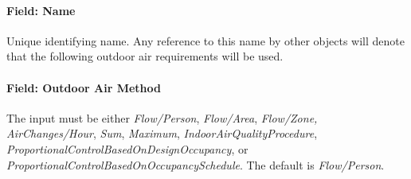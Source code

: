 \paragraph{Field: Name}\label{field-name-011}

Unique identifying name. Any reference to this name by other objects will denote that the following outdoor air requirements will be used.

\paragraph{Field: Outdoor Air Method}\label{field-outdoor-air-method}

The input must be either \emph{Flow/Person}, \emph{Flow/Area}, \emph{Flow/Zone, AirChanges/Hour}, \emph{Sum}, \emph{Maximum}, \emph{IndoorAirQualityProcedure}, \emph{ProportionalControlBasedOnDesignOccupancy}, or \emph{ProportionalControlBasedOnOccupancySchedule}. The default is \emph{Flow/Person}.
